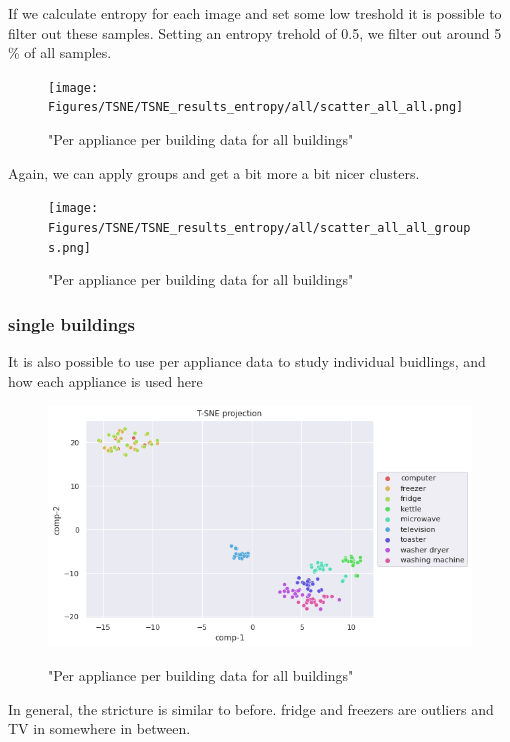 If we calculate entropy for each image and set some low treshold
it is possible to filter out these samples. 
Setting an entropy trehold of 0.5, we filter out around 5 \%
of all samples. 

\begin{figure}[H]
	\centering
	\caption{"Per appliance per building data for all buildings"}
	\texttt{[image: Figures/TSNE/TSNE\_results\_entropy/all/scatter\_all\_all.png]}
	\label{fig:tsne_papb_scatter_ent_all_groups}
\end{figure}

Again, we can apply groups and get a bit more a bit nicer clusters. 

\begin{figure}[H]
	\centering
	\caption{"Per appliance per building data for all buildings"}
	\texttt{[image: Figures/TSNE/TSNE\_results\_entropy/all/scatter\_all\_all\_groups.png]}
	\label{fig:tsne_papb_img_scatter_ent_all_groups}
\end{figure}


\subsubsection{single buildings}

It is also possible to use per appliance data to study
individual buidlings, and how each appliance is used here

\begin{figure}[H]
	\centering
	\caption{"Per appliance per building data for all buildings"}
	\includegraphics[width=.8\textwidth]{Figures/TSNE/TSNE_results/refit/scatter_refit_8.png}
	\label{fig:tsne_papb_scatter_ent_refit8}
\end{figure}

In general, the stricture is similar to before.
fridge and freezers are outliers and TV in somewhere in between.

